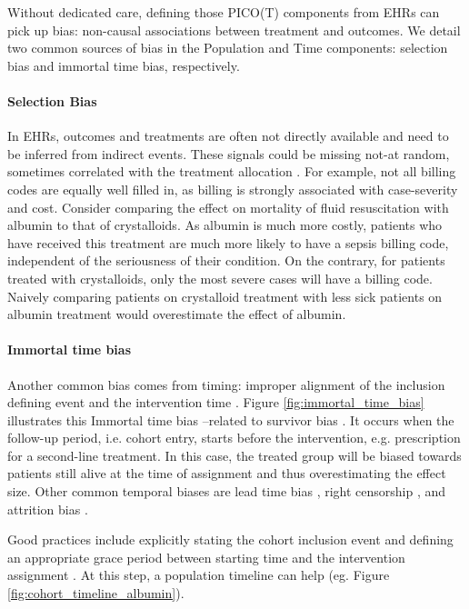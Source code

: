 \documentclass[french,12pt,twoside,a4paper]{book}
\begin{document}
Without dedicated care, defining those PICO(T) components from EHRs can
pick up bias: non-causal associations between treatment and outcomes.
We detail two common sources of bias in the
Population and Time components: selection bias and immortal time bias, respectively.

\paragraph{Selection Bias} In EHRs, outcomes and treatments are often not
directly available and need to be inferred from indirect events. These signals
could be missing not-at random, sometimes correlated with the treatment
allocation \citep{weiskopf2023healthcare}. For example, not all billing
codes are equally well filled in, as billing is strongly associated with
case-severity and cost.
Consider comparing the effect on mortality of fluid resuscitation
with albumin to that of crystalloids. As albumin is much more costly,
patients who have received this treatment are much more likely to have
a sepsis billing code, independent of the seriousness of their
condition. On the contrary, for patients treated with crystalloids, only
the most severe cases will have a billing code. Naively comparing patients on crystalloid treatment with
less sick patients on albumin treatment would overestimate the effect of albumin.

\paragraph{Immortal time bias} Another common bias comes from timing:
improper alignment of the inclusion defining event and the intervention time
\citep{suissa2008immortal,hernan2016specifying,wang2022understanding}. Figure
\ref{fig:immortal_time_bias} illustrates this
Immortal time bias --related to survivor bias \citep{lee2020immortaltimebias}.
It occurs when the follow-up period, i.e. cohort entry, starts before the
intervention, e.g. prescription for a
second-line treatment. In this case, the treated group will be
biased towards patients still alive at the time of assignment and thus
overestimating the effect size. Other common temporal biases are lead time bias
\citep{oke2021leadtimebias,fu2021timing}, right censorship
\citep{hernan2016specifying}, and attrition bias
\citep{Bankhead2017attritionbias}.


Good practices include explicitly stating the cohort inclusion event
\citep[Chapter~10:Defining Cohorts]{ohdsi2019book} and defining an appropriate
grace period between starting time and the intervention assignment
\citep{hernan2016specifying}. At this step, a population timeline can help (eg.
Figure \ref{fig:cohort_timeline_albumin}).
\end{document}
